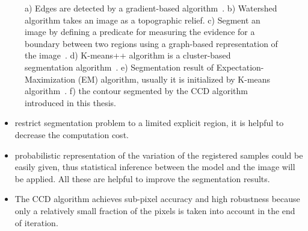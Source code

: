 \begin{figure}[htbp]
\begin{minipage}[t]{0.5\linewidth}
  \end{minipage} 
  \begin{minipage}[t]{0.5\linewidth} 
    \centering 
  \end{minipage}
  \begin{minipage}[t]{0.5\linewidth} 
    \centering 
  \end{minipage}%
\caption[Resulting images after applying some segmentation methods]{a)
  Edges are detected by a gradient-based algorithm~\cite{scharr2000optimal}. b) Watershed algorithm takes an image as a
  topographic relief. c) Segment an image by defining a predicate for
  measuring the evidence for a boundary between two regions using a
  graph-based representation of the
  image~\cite{felzenszwalb2004efficient}. d) K-means++ algorithm is a
  cluster-based segmentation algorithm~\cite{arthur2007k}. e)
  Segmentation result of Expectation-Maximization (EM) algorithm,
  usually it is initialized by K-means algorithm~\cite{bishop2006pattern}. f) the contour segmented by the CCD
  algorithm introduced in this thesis.}
\label{fig:seg_comparison}
\end{figure}

\begin{itemize}
\item restrict segmentation problem to a limited explicit region, it is helpful
  to decrease the computation cost.
\item probabilistic representation of the variation of the registered
  samples could be easily given, thus statistical inference between
  the model and the image will be applied. All these are helpful to
  improve the segmentation results.
\item The CCD algorithm achieves sub-pixel accuracy and high
  robustness because only a relatively small fraction of the pixels is
  taken into account in the end of iteration.
\end{itemize}

